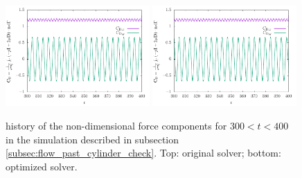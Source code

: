 \documentclass[11pt, a4paper]{article}
\theoremstyle{remark}
\begin{document}
\begin{figure}
  \centering
  \includegraphics[width=0.49\textwidth]{./results/flow_past_cylinder_smoke/reference/force_history.pdf}
  \includegraphics[width=0.49\textwidth]{./results/flow_past_cylinder_smoke/optimized_run/force_history.pdf}
 \caption{\label{fig:forces_flow_past_cylinder_check_unchanged} history of the non-dimensional force components for $300 < t < 400$ in the simulation described in subsection \ref{subsec:flow_past_cylinder_check}. Top: original solver; bottom: optimized solver.} 
\end{figure}
\end{document}
